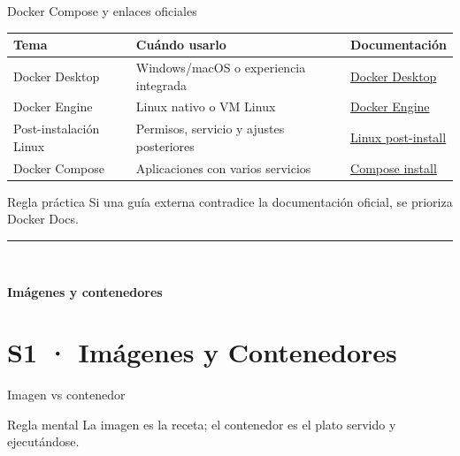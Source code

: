 \documentclass[aspectratio=169]{beamer}
\newcommand{\MainHeaderSlide}[2]{%
  \begingroup
  \setbeamercolor{background canvas}{bg=white}
  \begin{frame}[plain]
    \vfill
    \hspace*{0.9cm}%
    \begin{minipage}{0.78\paperwidth}
      {\color{UUblack}\rule{4cm}{1.3pt}}\\[14pt]
      {\raggedright\color{UUblack}\fontsize{36}{42}\selectfont\rmfamily\bfseries #1\par}
    \end{minipage}
    \vfill
  \end{frame}
  \endgroup
}
\begin{document}
\begin{frame}{Docker Compose y enlaces oficiales}
  \footnotesize
  \begin{tabular}{p{} p{} p{}}
    \toprule
    Tema & Cuándo usarlo & Documentación \\
    \midrule
    Docker Desktop & Windows/macOS o experiencia integrada & \href{https://docs.docker.com/desktop/}{Docker Desktop} \\
    Docker Engine & Linux nativo o VM Linux & \href{https://docs.docker.com/engine/install/}{Docker Engine} \\
    Post-instalación Linux & Permisos, servicio y ajustes posteriores & \href{https://docs.docker.com/engine/install/linux-postinstall/}{Linux post-install} \\
    Docker Compose & Aplicaciones con varios servicios & \href{https://docs.docker.com/compose/install/}{Compose install} \\
    \bottomrule
  \end{tabular}
  \vspace{0.25cm}
  \begin{alertblock}{Regla práctica}
    Si una guía externa contradice la documentación oficial, se prioriza Docker Docs.
  \end{alertblock}
\end{frame}

\MainHeaderSlide{Imágenes y contenedores}{La diferencia que debes dominar antes de escribir comandos}
\section{S1 · Imágenes y Contenedores}

\begin{frame}{Imagen vs contenedor}
  \begin{center}
  \end{center}
  \begin{alertblock}{Regla mental}
    La imagen es la receta; el contenedor es el plato servido y ejecutándose.
  \end{alertblock}
\end{frame}
\end{document}
